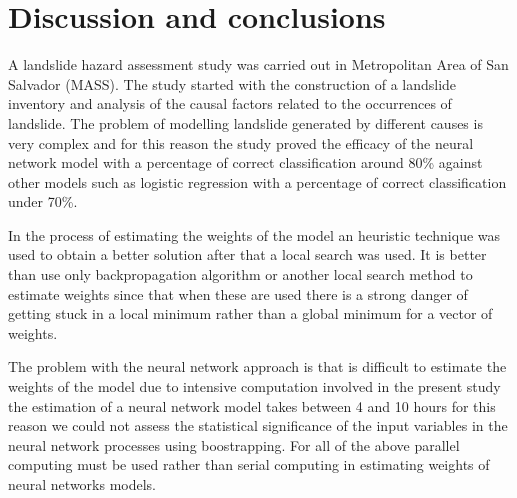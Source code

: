 \documentclass[11pt,twoside]{rmta2010esp}%
\begin{document}

%


\section{Discussion and conclusions}
A landslide hazard assessment study was carried out in Metropolitan Area of San Salvador (MASS). The study started with the construction of a landslide inventory and analysis of the causal factors related to the occurrences of landslide. The problem of modelling landslide generated by different causes is very complex and for this reason the study proved the efficacy of the neural network model with a percentage of correct classification around 80\% against other models such as logistic regression with a percentage of correct classification under 70\%. 

In the process of estimating the weights of the model an heuristic technique was used to obtain a better solution after that a local search was used. It is better than use only backpropagation algorithm or another local search method to estimate weights since that when these are used there is a strong danger of getting stuck in a local minimum rather than a global minimum for a vector of weights.

The problem with the neural network approach is that is difficult to estimate the weights of the model due to intensive computation involved in the present study the estimation of a neural network model takes between 4 and 10 hours for this reason we could not assess the statistical significance of the input variables in the neural network processes using boostrapping. For all of the above parallel computing must be used rather than serial computing in estimating weights of neural networks models.


\end{document}
